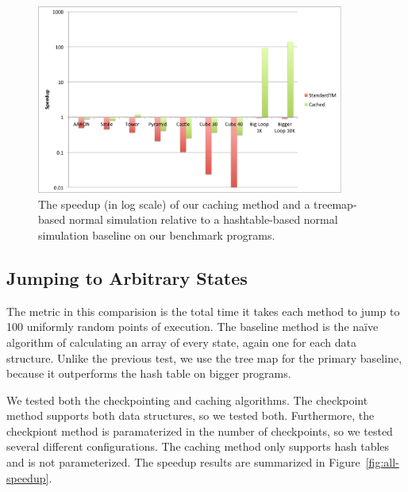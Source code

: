 \documentclass{sig-alternate}
\begin{document}
\begin{figure}[ht!]
  \centering
  \includegraphics[width=0.9\textwidth]{images/lso-speedup}
  \caption{The speedup (in log scale) of our caching method and a treemap-based normal simulation relative to a hashtable-based normal simulation baseline on our benchmark programs.}
  \label{fig:lso-speedup}
\end{figure}


\subsection{Jumping to Arbitrary States}
The metric in this comparision is the total time it takes each method to jump to 100 uniformly random points of execution. The baseline method is the na\"{i}ve algorithm of calculating an array of every state, again one for each data structure. Unlike the previous test, we use the tree map for the primary baseline, because it outperforms the hash table on bigger programs.

We tested both the checkpointing and caching algorithms. The checkpoint method supports both data structures, so we tested both. Furthermore, the checkpiont method is paramaterized in the number of checkpoints, so we tested several different configurations. The caching method only supports hash tables and is not parameterized. The speedup results are summarized in Figure~\ref{fig:all-speedup}.
\end{document}

